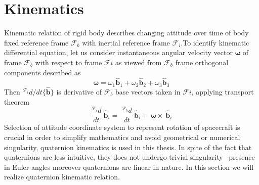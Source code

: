 \section{Kinematics}
Kinematic relation of rigid body describes changing attitude over time of body fixed reference frame $\displaystyle \mathcal{F}_{b}$ with inertial reference frame $\displaystyle \mathcal{F}_{i}$.To identify kinematic differential equation, let us consider instantaneous angular velocity vector $\displaystyle \mathbf{\omega }$ of frame $\displaystyle \mathcal{F}_{b}$ with respect to frame $\displaystyle \mathcal{F} i$ as viewed from $\displaystyle \mathcal{F}_{b}$ frame orthogonal components described as
\begin{equation*}
\mathbf{\omega } =\omega_{1}\hat{\mathbf{b}}_{1} +\omega_{2}\hat{\mathbf{b}}_{2} +\omega_{3}\hat{\mathbf{b}}_{3}
\end{equation*}
Then $\displaystyle ^{\mathcal{F}_{i}} d/dt\{\hat{\mathbf{b}}\}$ is derivative of $\displaystyle \mathcal{F}_{b}$ base vectors taken in $\displaystyle \mathcal{F} i$, applying transport theorem
\begin{equation}
\frac{^{\mathcal{F}_{i}} d}{dt} \ \hat{\mathbf{b}}_{i} =\ \frac{^{\mathcal{F}_{b}} d}{dt} \ \hat{\mathbf{b}}_{i} +\ \mathbf{\omega } \times \ \hat{\mathbf{b}}_{i}
\end{equation}
Selection of attitude coordinate system to represent rotation of spacecraft is crucial in order to simplify mathematics and avoid geometrical or numerical singularity, quaternion kinematics is used in this thesis. In spite of the fact that quaternions are less intuitive, they does not undergo trivial singularity \ presence in Euler angles moreover quaternions are linear in nature. In this section we will realize quaternion kinematic relation.

